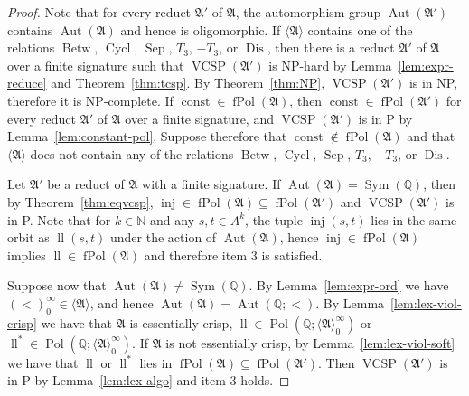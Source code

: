 \documentclass[preprint,12pt]{elsarticle}
\newcommand{\N}{\mathbb N}
\newcommand{\Q}{\mathbb Q}
\newcommand{\bA}{{\mathfrak A}}
\newcommand{\checked}[1]{#1}
\DeclareMathOperator{\Cyc}{Cycl}
\DeclareMathOperator{\Aut}{Aut}
\DeclareMathOperator{\fPol}{fPol}
\DeclareMathOperator{\VCSP}{VCSP}
\DeclareMathOperator{\Pol}{Pol}
\DeclareMathOperator{\Sym}{Sym}
\DeclareMathOperator{\mi}{mi}
\DeclareMathOperator{\lele}{ll}
\DeclareMathOperator{\mx}{mx}
\DeclareMathOperator{\lex}{lex}
\DeclareMathOperator{\inj}{inj}
\DeclareMathOperator{\const}{const}
\DeclareMathOperator{\Betw}{Betw}
\DeclareMathOperator{\Sep}{Sep}
\DeclareMathOperator{\Dis}{Dis}
\begin{document}
\begin{proof}
Note that for every reduct $\bA'$ of $\bA$, the automorphism group $\Aut(\bA')$ contains $\Aut(\bA)$ and hence is oligomorphic. If $\langle \bA \rangle$ contains one of the relations $\Betw$, $\Cyc$, $\Sep$, $T_3$, $-T_3$, or $\Dis$,
then there is a reduct $\bA'$ of $\bA$ over a finite signature such that $\VCSP(\bA')$ is NP-hard by Lemma~\ref{lem:expr-reduce} and
Theorem~\ref{thm:tcsp}.
By Theorem~\ref{thm:NP}, $\VCSP(\bA')$ is in NP, therefore it is NP-complete. If $\const \in \fPol(\bA)$, then $\const \in \fPol(\bA')$ for every reduct $\bA'$ of $\bA$ over a finite signature, and $\VCSP(\bA')$ is in P by Lemma~\ref{lem:constant-pol}. Suppose therefore that $\const \notin \fPol(\bA)$ and
that $\langle \bA \rangle$ does not contain any of the relations $\Betw$, $\Cyc$, $\Sep$, $T_3$, $-T_3$, or $\Dis$. 

Let $\bA'$ be a reduct of $\bA$ with a finite signature.
If $\Aut(\bA) = \Sym(\Q)$, then by Theorem~\ref{thm:eqvcsp}, $\inj \in \fPol(\bA) \subseteq \fPol(\bA')$ and $\VCSP(\bA')$ is in P. 
\checked{Note that for $k \in \N$ and any $s, t \in A^k$, the tuple $\inj(s,t)$ lies in the same orbit as $\lele(s,t)$ under the action of $\Aut(\bA)$, hence $\inj \in \fPol(\bA)$ implies $\lele \in \fPol(\bA)$}
and therefore item 3 is satisfied. 

Suppose now that $\Aut(\bA) \neq \Sym(\Q)$. By Lemma~\ref{lem:expr-ord} we have $(<)_0^\infty \in \langle \bA \rangle$, and hence $\Aut(\bA)=\Aut(\Q;<)$. By Lemma~\ref{lem:lex-viol-crisp}  we have that $\bA$ is essentially crisp, \checked{ 
$\lele \in \Pol(\Q; \langle \bA \rangle_0^\infty)$ or $\lele^* \in \Pol(\Q; \langle \bA \rangle_0^\infty)$.} If $\bA$ is not essentially crisp, \checked{by Lemma~\ref{lem:lex-viol-soft} we have that $\lele$ or $\lele^*$ lies in} $\fPol(\bA) \subseteq \fPol(\bA')$.
Then $\VCSP(\bA')$ is in P by Lemma~\ref{lem:lex-algo} and item 3 holds. 


\end{proof}
\end{document}
